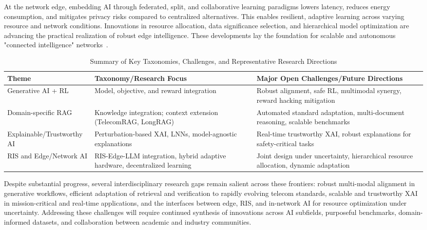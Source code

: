 \documentclass[sigconf]{acmart}
\begin{document}
At the network edge, embedding AI through federated, split, and collaborative learning paradigms lowers latency, reduces energy consumption, and mitigates privacy risks compared to centralized alternatives. This enables resilient, adaptive learning across varying resource and network conditions. Innovations in resource allocation, data significance selection, and hierarchical model optimization are advancing the practical realization of robust edge intelligence. These developments lay the foundation for scalable and autonomous "connected intelligence" networks~\cite{ref35, ref36, ref37, ref38, ref39, ref40, ref41, ref42}.

\begin{table*}[htbp]
\centering
\caption{Summary of Key Taxonomies, Challenges, and Representative Research Directions}
\label{tab:key_challenges}
\begin{adjustbox}{max width=\textwidth}
\begin{tabular}{@{}lll@{}}
\toprule
Theme & Taxonomy/Research Focus & Major Open Challenges/Future Directions \\
\midrule
Generative AI + RL & Model, objective, and reward integration~\cite{ref1,ref2,ref4,ref5,ref6} & Robust alignment, safe RL, multimodal synergy, reward hacking mitigation~\cite{ref1,ref3} \\
Domain-specific RAG & Knowledge integration; context extension (TelecomRAG, LongRAG)~\cite{ref13,ref16,ref20} & Automated standard adaptation, multi-document reasoning, scalable benchmarks~\cite{ref16,ref20} \\
Explainable/Trustworthy AI & Perturbation-based XAI, LNNs, model-agnostic explanations~\cite{ref35,ref38,ref41,ref43,ref44} & Real-time trustworthy XAI, robust explanations for safety-critical tasks~\cite{ref41,ref43} \\
RIS and Edge/Network AI & RIS-Edge-LLM integration, hybrid adaptive hardware, decentralized learning~\cite{ref28,ref34,ref35,ref49} & Joint design under uncertainty, hierarchical resource allocation, dynamic adaptation~\cite{ref36,ref42,ref47,ref48} \\
\bottomrule
\end{tabular}
\end{adjustbox}
\end{table*}

Despite substantial progress, several interdisciplinary research gaps remain salient across these frontiers: robust multi-modal alignment in generative workflows, efficient adaptation of retrieval and verification to rapidly evolving telecom standards, scalable and trustworthy XAI in mission-critical and real-time applications, and the interfaces between edge, RIS, and in-network AI for resource optimization under uncertainty. Addressing these challenges will require continued synthesis of innovations across AI subfields, purposeful benchmarks, domain-informed datasets, and collaboration between academic and industry communities.
\end{document}
